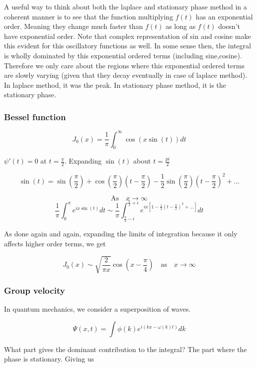 \documentclass{report}
\begin{document}
\noindent A useful way to think about both the laplace and stationary phase method in a coherent manner is to see that the function multiplying $f(t)$ has an exponential order. Meaning they change much faster than $f(t)$ as long as $f(t)$ doesn't have exponential order. Note that complex representation of sin and cosine make this evident for this oscillatory functions as well. In some sense then, the integral is wholly dominated by this exponential ordered terms (including sine,cosine). Therefore we only care about the regions where this exponential ordered terms are slowly varying (given that they decay eventually in case of laplace method). In laplace method, it was the peak. In stationary phase method, it is the stationary phase.\\

\subsubsection{Bessel function}

$$J_0(x) = \frac{1}{\pi}\int_{0}^{\infty}\cos(x\sin(t)) dt$$

\noindent $\psi'(t) = 0$ at $t=\frac{\pi}{2}$. Expanding $\sin(t)$ about $t=\frac{pi}{2}$

$$\sin\left(t\right) = \sin\left(\frac{\pi}{2}\right) + \cos\left(\frac{\pi}{2}\right)\left(t-\frac{\pi}{2}\right) -\frac{1}{2}\sin\left(\frac{\pi}{2}\right)\left(t-\frac{\pi}{2}\right)^2 + ...$$

$$\mathrm{As}\quad x\to\infty$$ 
$$\frac{1}{\pi}\int_{0}^{\pi}e^{ix\sin(t)}dt\sim \frac{1}{\pi}\int_{\frac{\pi}{2}-\epsilon}^{\frac{\pi}{2}+\epsilon}e^{ix\left[1-\frac{1}{2}\left(t-\frac{\pi}{2}\right)^2 +...\right]}dt$$

\noindent As done again and again, expanding the limits of integration because it only affects higher order terms, we get 

$$J_0\left(x\right) \sim \sqrt{\frac{2}{\pi x}} \cos\left(x-\frac{\pi}{4}\right) \quad\mathrm{as}\quad x\to\infty$$

\subsubsection{Group velocity}

In quantum mechanics, we consider a superposition of waves.

$$\Psi(x,t) = \int{\phi(k)e^{i(kx-\omega(k)t)}}dk$$

\noindent What part gives the dominant contribution to the integral? The part where the phase is stationary. Giving us
\end{document}
